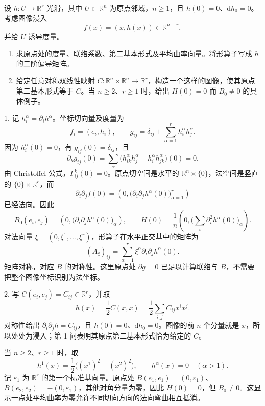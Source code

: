 \begin{exercise}\label{g3:ex:graph-prescribed-second-fundamental-form}
	设 \(h:U\to\mathbb R^r\) 光滑，其中 \(U\subset\mathbb R^n\) 为原点邻域，\(n\ge1\)，且 \(h(0)=0\)、\(\mathrm dh_0=0\)。考虑图像浸入
	\[
		f(x)=(x,h(x))\in\mathbb R^{n+r},
	\]
	并给 \(U\) 诱导度量。
	\begin{enumerate}
		\item 求原点处的度量、联络系数、第二基本形式及平均曲率向量。将形算子写成 \(h\) 的二阶偏导矩阵。
		\item 给定任意对称双线性映射 \(C:\mathbb R^n\times\mathbb R^n\to\mathbb R^r\)，构造一个这样的图像，使其原点第二基本形式等于 \(C\)。当 \(n\ge2\)、\(r\ge1\) 时，给出 \(H(0)=0\) 而 \(B_0\ne0\) 的具体例子。
	\end{enumerate}
\end{exercise}
\begin{solution}
	1. 记 \(h_i^\alpha=\partial_i h^\alpha\)。坐标切向量及度量为
	\[
		f_i=(e_i,h_i),\qquad
		g_{ij}=\delta_{ij}+\sum_{\alpha=1}^r h_i^\alpha h_j^\alpha.
	\]
	因为 \(h_i^\alpha(0)=0\)，有 \(g_{ij}(0)=\delta_{ij}\)，且
	\[
		\partial_kg_{ij}(0)
		=\sum_\alpha
			\bigl(h_{ik}^\alpha h_j^\alpha+h_i^\alpha h_{jk}^\alpha\bigr)(0)=0.
	\]
	由 Christoffel 公式，\(\Gamma^k_{ij}(0)=0\)。原点切空间是水平的 \(\mathbb R^n\times\{0\}\)，法空间是竖直的 \(\{0\}\times\mathbb R^r\)，而
	\[
		\partial_i\partial_jf(0)
		=\left(0,\bigl(\partial_i\partial_jh^\alpha(0)\bigr)_{\alpha=1}^r\right)
	\]
	已经法向。因此
	\[
		B_0(e_i,e_j)
		=\left(0,\bigl(\partial_i\partial_jh^\alpha(0)\bigr)_\alpha\right),
		\qquad
		H(0)=\frac1n
			\left(0,\bigl(\sum_i\partial_i^2h^\alpha(0)\bigr)_\alpha\right).
	\]
	对法向量 \(\xi=(0,\xi^1,\ldots,\xi^r)\)，形算子在水平正交基中的矩阵为
	\[
		(A_\xi)_{ij}
		=\sum_{\alpha=1}^r\xi^\alpha\partial_i\partial_jh^\alpha(0).
	\]
	矩阵对称，对应 \(B\) 的对称性。这里原点处 \(\partial g=0\) 已足以计算联络与 \(B\)，不需要把整个图像坐标识别为法坐标。

	2. 写 \(C(e_i,e_j)=C_{ij}\in\mathbb R^r\)，并取
	\[
		h(x)=\frac12C(x,x)=\frac12\sum_{i,j}C_{ij}x^ix^j.
	\]
	对称性给出 \(\partial_i\partial_jh=C_{ij}\)，且 \(h(0)=0\)、\(\mathrm dh_0=0\)。图像的前 \(n\) 个分量就是 \(x\)，所以处处为浸入；第 1 问表明其原点第二基本形式恰为给定的 \(C\)。

	当 \(n\ge2\)、\(r\ge1\) 时，取
	\[
		h^1(x)=\frac12\bigl((x^1)^2-(x^2)^2\bigr),\qquad
		h^\alpha(x)=0\quad(\alpha>1).
	\]
	记 \(\varepsilon_1\) 为 \(\mathbb R^r\) 的第一个标准基向量。原点处 \(B(e_1,e_1)=(0,\varepsilon_1)\)、\(B(e_2,e_2)=-(0,\varepsilon_1)\)，其他对角分量为零，因此 \(H(0)=0\)，但 \(B_0\ne0\)。这显示一点处平均曲率为零允许不同切向方向的法向弯曲相互抵消。
\end{solution}

